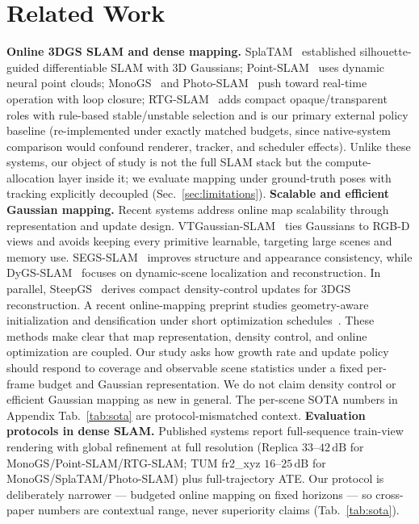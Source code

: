 \documentclass[10pt,twocolumn,letterpaper]{article}
\begin{document}
\section{Related Work}
\textbf{Online 3DGS SLAM and dense mapping.}
SplaTAM~\cite{keetha2023splatam} established silhouette-guided differentiable SLAM with 3D Gaussians; Point-SLAM~\cite{sandstrom2023pointslam} uses dynamic neural point clouds; MonoGS~\cite{matsuki2024gaussian} and Photo-SLAM~\cite{huang2024photoslam} push toward real-time operation with loop closure; RTG-SLAM~\cite{peng2024rtgslam} adds compact opaque/transparent roles with rule-based stable/unstable selection and is our primary external policy baseline (re-implemented under exactly matched budgets, since native-system comparison would confound renderer, tracker, and scheduler effects).
Unlike these systems, our object of study is not the full SLAM stack but the compute-allocation layer inside it; we evaluate mapping under ground-truth poses with tracking explicitly decoupled (Sec.~\ref{sec:limitations}).
\textbf{Scalable and efficient Gaussian mapping.}
Recent systems address online map scalability through representation and update design. VTGaussian-SLAM~\cite{hu2025vtgs} ties Gaussians to RGB-D views and avoids keeping every primitive learnable, targeting large scenes and memory use. SEGS-SLAM~\cite{wen2025segs} improves structure and appearance consistency, while DyGS-SLAM~\cite{hu2025dygs} focuses on dynamic-scene localization and reconstruction. In parallel, SteepGS~\cite{wang2025steepgs} derives compact density-control updates for 3DGS reconstruction. A recent online-mapping preprint studies geometry-aware initialization and densification under short optimization schedules~\cite{luu2026geometry}.
These methods make clear that map representation, density control, and online optimization are coupled. Our study asks how growth rate and update policy should respond to coverage and observable scene statistics under a fixed per-frame budget and Gaussian representation. We do not claim density control or efficient Gaussian mapping as new in general. The per-scene SOTA numbers in Appendix Tab.~\ref{tab:sota} are protocol-mismatched context.
\textbf{Evaluation protocols in dense SLAM.}
Published systems report full-sequence train-view rendering with global refinement at full resolution (Replica $33$--$42\,\mathrm{dB}$ for MonoGS/Point-SLAM/RTG-SLAM; TUM fr2\_xyz $16$--$25\,\mathrm{dB}$ for MonoGS/SplaTAM/Photo-SLAM) plus full-trajectory ATE. Our protocol is deliberately narrower --- budgeted online mapping on fixed horizons --- so cross-paper numbers are contextual range, never superiority claims (Tab.~\ref{tab:sota}).
\end{document}
